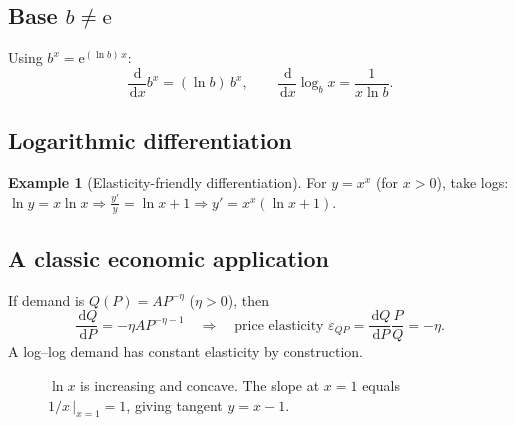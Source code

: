 \documentclass[12pt]{article}
\newcommand{\dd}{\,\mathrm{d}}
\newcommand{\e}{\mathrm{e}}
\newcommand{\1}{\mathbf{1}}
\theoremstyle{definition}
\newtheorem{example}{Example}
\theoremstyle{plain}
\begin{document}
\subsection*{Base \(b\neq \e\)}
Using \(b^{x}=\e^{(\ln b)\,x}\):
\[
\frac{\dd}{\dd x}b^{x}=(\ln b)\,b^{x},\qquad
\frac{\dd}{\dd x}\log_b x=\frac{1}{x\ln b}.
\]

\subsection*{Logarithmic differentiation}
\begin{example}[Elasticity-friendly differentiation]
For \(y=x^{x}\) (for \(x>0\)), take logs: \(\ln y=x\ln x\Rightarrow \frac{y'}{y}=\ln x+1\Rightarrow y'=x^{x}(\ln x+1)\).
\end{example}

\subsection*{A classic economic application}
If demand is \(Q(P)=A P^{-\eta}\) (\(\eta>0\)), then
\[
\frac{\dd Q}{\dd P}=-\eta A P^{-\eta-1} \quad\Rightarrow\quad
\text{price elasticity } \varepsilon_{QP}=\frac{\dd Q}{\dd P}\frac{P}{Q}=-\eta.
\]
A log--log demand has constant elasticity by construction.


\begin{figure}[htb]
\centering
{}
\caption{$\ln x$ is increasing and concave. The slope at $x=1$ equals $1/x\,\big|_{x=1}=1$, giving tangent $y=x-1$.}
\label{fig:lnx-tangent}
\end{figure}
\end{document}
